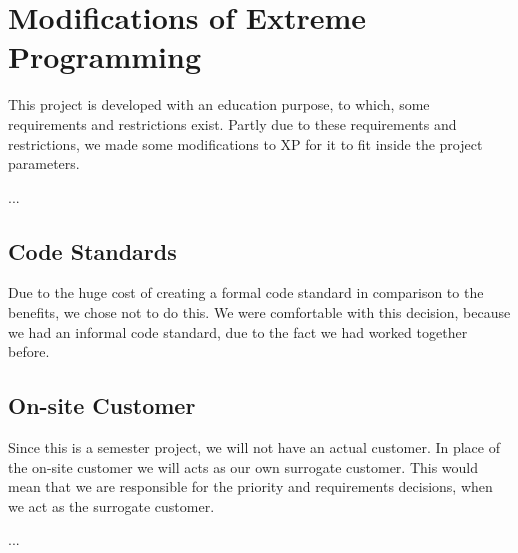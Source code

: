 \section{Modifications of Extreme Programming}
This project is developed with an education purpose, to which, some requirements and restrictions exist.
Partly due to these requirements and restrictions, we made some modifications to XP for it to fit inside the project parameters.

...

\subsection{Code Standards}
Due to the huge cost of creating a formal code standard in comparison to the benefits, we chose not to do this.
We were comfortable with this decision, because we had an informal code standard, due to the fact we had worked together before.


\subsection{On-site Customer}
Since this is a semester project, we will not have an actual customer.
In place of the on-site customer we will acts as our own surrogate customer.
This would mean that we are responsible for the priority and requirements decisions, when we act as the surrogate customer.

...


